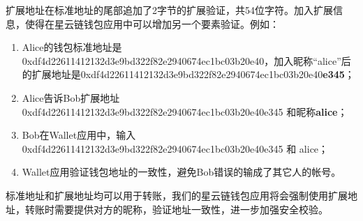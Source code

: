 扩展地址在标准地址的尾部追加了2字节的扩展验证，共54位字符。加入扩展信息，使得在星云链钱包应用中可以增加另一个要素验证。例如：
\begin{enumerate}
	\item Alice的钱包标准地址是 0xdf4d22611412132d3e9bd322f82e2940674ec1bc03b20e40，加入昵称“alice”后的扩展地址是0xdf4d22611412132d3e9bd322f82e2940674ec1bc03b20e40\textbf{e345}；
	\item Alice告诉Bob扩展地址 0xdf4d22611412132d3e9bd322f82e2940674ec1bc03b20e40e345 和昵称\textbf{alice}；
	\item Bob在Wallet应用中，输入 0xdf4d22611412132d3e9bd322f82e2940674ec1bc03b20e40e345 和 alice；
	\item Wallet应用验证钱包地址的一致性，避免Bob错误的输成了其它人的帐号。
\end{enumerate}

标准地址和扩展地址均可以用于转账，我们的星云链钱包应用将会强制使用扩展地址，转账时需要提供对方的昵称，验证地址一致性，进一步加强安全校验。
